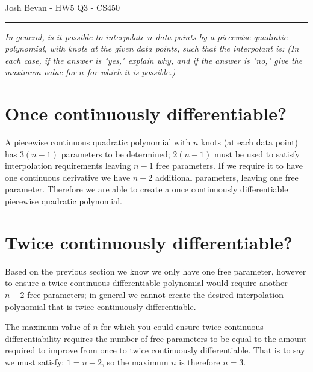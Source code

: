 \documentclass[letterpaper,10pt]{article}
\begin{document}
\begin{flushright}
{\Large Josh Bevan - HW5 Q3 - CS450}
\end{flushright}
\vskip -0.1in
\hrule
\vskip 0.3in

\textit{In general, is it possible to interpolate $n$ data points by a piecewise quadratic polynomial, with knots at the given data points, such that the interpolant is: (In each case, if the answer is "yes," explain why, and if the answer is "no," give the maximum value for $n$ for which it is possible.)}

\section*{Once continuously differentiable?}
A piecewise continuous quadratic polynomial with $n$ knots (at each data point) has $3(n-1)$ parameters to be determined; $2(n-1)$ must be used to satisfy interpolation requirements leaving $n-1$ free parameters. If we require it to have one continuous derivative we have $n-2$ additional parameters, leaving one free parameter. Therefore we are able to create a once continuously differentiable piecewise quadratic polynomial.

\section*{Twice continuously differentiable?}
Based on the previous section we know we only have one free parameter, however to ensure a twice continuous differentiable polynomial would require another $n-2$ free parameters; in general we cannot create the desired interpolation polynomial that is twice continuously differentiable.

The maximum value of $n$ for which you could ensure twice continuous differentiability requires the number of free parameters to be equal to the amount required to improve from once to twice continuously differentiable. That is to say we must satisfy: $1 = n-2$, so the maximum $n$ is therefore $n=3$.
\end{document}
